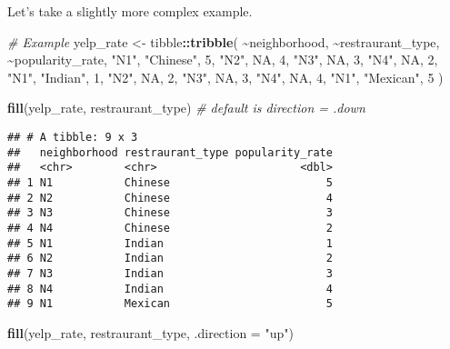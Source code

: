 \documentclass[
]{book}
\newenvironment{Shaded}{\begin{snugshade}}{\end{snugshade}}
\newcommand{\CommentTok}[1]{\textcolor[rgb]{0.56,0.35,0.01}{\textit{#1}}}
\newcommand{\DataTypeTok}[1]{\textcolor[rgb]{0.13,0.29,0.53}{#1}}
\newcommand{\DecValTok}[1]{\textcolor[rgb]{0.00,0.00,0.81}{#1}}
\newcommand{\KeywordTok}[1]{\textcolor[rgb]{0.13,0.29,0.53}{\textbf{#1}}}
\newcommand{\NormalTok}[1]{#1}
\newcommand{\OperatorTok}[1]{\textcolor[rgb]{0.81,0.36,0.00}{\textbf{#1}}}
\newcommand{\OtherTok}[1]{\textcolor[rgb]{0.56,0.35,0.01}{#1}}
\newcommand{\StringTok}[1]{\textcolor[rgb]{0.31,0.60,0.02}{#1}}
\begin{document}
Let's take a slightly more complex example.

\begin{Shaded}
\begin{Highlighting}[]
\CommentTok{\# Example}
\NormalTok{yelp\_rate \textless{}{-}}\StringTok{ }\NormalTok{tibble}\OperatorTok{::}\KeywordTok{tribble}\NormalTok{(}
  \OperatorTok{\textasciitilde{}}\NormalTok{neighborhood, }\OperatorTok{\textasciitilde{}}\NormalTok{restraurant\_type, }\OperatorTok{\textasciitilde{}}\NormalTok{popularity\_rate,}
  \StringTok{"N1"}\NormalTok{, }\StringTok{"Chinese"}\NormalTok{, }\DecValTok{5}\NormalTok{,}
  \StringTok{"N2"}\NormalTok{, }\OtherTok{NA}\NormalTok{, }\DecValTok{4}\NormalTok{,}
  \StringTok{"N3"}\NormalTok{, }\OtherTok{NA}\NormalTok{, }\DecValTok{3}\NormalTok{,}
  \StringTok{"N4"}\NormalTok{, }\OtherTok{NA}\NormalTok{, }\DecValTok{2}\NormalTok{,}
  \StringTok{"N1"}\NormalTok{, }\StringTok{"Indian"}\NormalTok{, }\DecValTok{1}\NormalTok{,}
  \StringTok{"N2"}\NormalTok{, }\OtherTok{NA}\NormalTok{, }\DecValTok{2}\NormalTok{,}
  \StringTok{"N3"}\NormalTok{, }\OtherTok{NA}\NormalTok{, }\DecValTok{3}\NormalTok{,}
  \StringTok{"N4"}\NormalTok{, }\OtherTok{NA}\NormalTok{, }\DecValTok{4}\NormalTok{,}
  \StringTok{"N1"}\NormalTok{, }\StringTok{"Mexican"}\NormalTok{, }\DecValTok{5}
\NormalTok{)}

\KeywordTok{fill}\NormalTok{(yelp\_rate, restraurant\_type) }\CommentTok{\# default is direction = .down}
\end{Highlighting}
\end{Shaded}

\begin{verbatim}
## # A tibble: 9 x 3
##   neighborhood restraurant_type popularity_rate
##   <chr>        <chr>                      <dbl>
## 1 N1           Chinese                        5
## 2 N2           Chinese                        4
## 3 N3           Chinese                        3
## 4 N4           Chinese                        2
## 5 N1           Indian                         1
## 6 N2           Indian                         2
## 7 N3           Indian                         3
## 8 N4           Indian                         4
## 9 N1           Mexican                        5
\end{verbatim}

\begin{Shaded}
\begin{Highlighting}[]
\KeywordTok{fill}\NormalTok{(yelp\_rate, restraurant\_type, }\DataTypeTok{.direction =} \StringTok{"up"}\NormalTok{)}
\end{Highlighting}
\end{Shaded}
\end{document}
